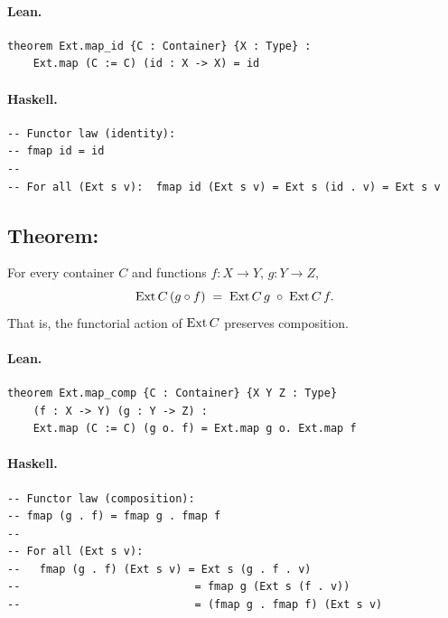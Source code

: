 \documentclass[11pt,a4paper]{article}
\begin{document}
\paragraph{Lean.}
\begin{lstlisting}[style=lean]
theorem Ext.map_id {C : Container} {X : Type} :
    Ext.map (C := C) (id : X -> X) = id
\end{lstlisting}

\paragraph{Haskell.}
\begin{lstlisting}[style=haskell]
-- Functor law (identity):
-- fmap id = id
--
-- For all (Ext s v):  fmap id (Ext s v) = Ext s (id . v) = Ext s v
\end{lstlisting}


\subsection{Theorem: }

\begin{thm}
For every container $C$ and functions $f : X \to Y$, $g : Y \to Z$,
\[
  \mathrm{Ext}\,C\,(g \circ f) \;=\; \mathrm{Ext}\,C\,g \;\circ\; \mathrm{Ext}\,C\,f.
\]
That is, the functorial action of $\mathrm{Ext}\,C$ preserves composition.
\end{thm}

\paragraph{Lean.}
\begin{lstlisting}[style=lean]
theorem Ext.map_comp {C : Container} {X Y Z : Type}
    (f : X -> Y) (g : Y -> Z) :
    Ext.map (C := C) (g o. f) = Ext.map g o. Ext.map f
\end{lstlisting}

\paragraph{Haskell.}
\begin{lstlisting}[style=haskell]
-- Functor law (composition):
-- fmap (g . f) = fmap g . fmap f
--
-- For all (Ext s v):
--   fmap (g . f) (Ext s v) = Ext s (g . f . v)
--                           = fmap g (Ext s (f . v))
--                           = (fmap g . fmap f) (Ext s v)
\end{lstlisting}
\end{document}
